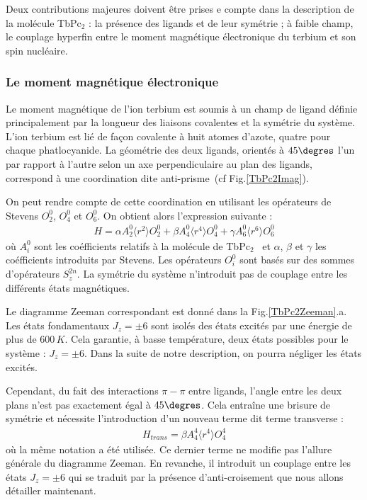 Deux contributions majeures doivent être prises e compte dans la description de la molécule TbPc$_{2}$ : la présence des ligands et de leur symétrie ; à faible champ, le couplage hyperfin entre le moment magnétique électronique du terbium et son spin nucléaire.

\subsubsection{Le moment magnétique électronique}
Le moment magnétique de l'ion terbium est soumis à un champ de ligand définie principalement par la longueur des liaisons covalentes et la symétrie du système. 
L'ion terbium est lié de façon covalente à huit atomes d'azote, quatre pour chaque phatlocyanide. La géométrie des deux ligands, orientés à $45\degres$ l'un par rapport à l'autre selon un axe perpendiculaire au plan des ligands, correspond à une coordination dite anti-prisme~(cf Fig.\ref{TbPc2Imag}). 

On peut rendre compte de cette coordination en utilisant les opérateurs de Stevens $O_2^0$, $O_4^0$ et $O_6^0$. On obtient alors l'expression suivante :
\begin{eqnarray}
H = \alpha A_2^0 \langle r^2 \rangle O_2^0 + \beta A_4^0 \langle r^4 \rangle O_4^0 + \gamma A_6^0 \langle r^6 \rangle O_6^0
\end{eqnarray}
où $A_i^0$ sont les coéfficients relatifs à la molécule de TbPc$_2$~\cite{Ishikawa2005} et $\alpha$, $\beta$ et $\gamma$ les coéfficients introduits par Stevens. Les opérateurs $O^0_i$ sont basés sur des sommes d'opérateurs $S_z^{2n}$. La symétrie du système n'introduit pas de couplage entre les différents états magnétiques. 

Le diagramme Zeeman correspondant est donné dans la Fig.\ref{TbPc2Zeeman}.a. Les états fondamentaux $J_z = \pm 6$ sont isolés des états excités par une énergie de plus de $600\,K$. Cela garantie, à basse température, deux états possibles pour le système : $J_z = \pm 6$. Dans la suite de notre description, on pourra négliger les états excités.

 
Cependant, du fait des interactions $\pi - \pi$ entre ligands, l'angle entre les deux plans n'est pas exactement égal à $45\degres$. Cela entraîne une brisure de symétrie et nécessite l'introduction d'un nouveau terme dit terme transverse :
\begin{eqnarray}
H_{trans} = \beta A_4^4 \langle r^4 \rangle O_4^4
\end{eqnarray}
où la m\^eme notation a été utilisée. Ce dernier terme ne modifie pas l'allure générale du diagramme Zeeman. En revanche, il introduit un couplage entre les états  $J_z = \pm 6$ qui se traduit par la présence d'anti-croisement que nous allons détailler maintenant.


